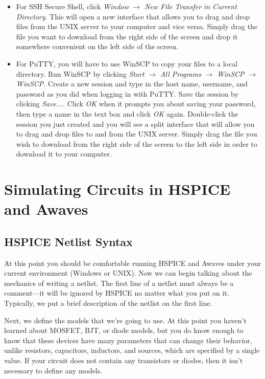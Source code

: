 \documentclass{article}
\begin{document}
\begin{enumerate}
    \begin{itemize}
      \item For SSH Secure Shell, click \textit{Window} $\rightarrow$ \textit{New File Transfer in Current Directory}. This will open a new interface that allows you to drag and drop files from the UNIX server to your computer and vice versa. Simply drag the file you want to download from the right side of the screen and drop it somewhere convenient on the left side of the screen.
      \item For PuTTY, you will have to use WinSCP to copy your files to a local directory. Run WinSCP by clicking \textit{Start} $\rightarrow$ \textit{All Programs} $\rightarrow$ \textit{WinSCP} $\rightarrow$ \textit{WinSCP}. Create a new session and type in the host name, username, and password as you did when logging in with PuTTY. Save the session by clicking \textit{Save...}. Click \textit{OK} when it prompts you about saving your password, then type a name in the text box and click \textit{OK} again. Double-click the session you just created and you will see a split interface that will allow you to drag and drop files to and from the UNIX server. Simply drag the file you wish to download from the right side of the screen to the left side in order to download it to your computer.
    \end{itemize}
\end{enumerate}

\section{Simulating Circuits in HSPICE and Awaves}

\subsection{HSPICE Netlist Syntax}

At this point you should be comfortable running HSPICE and Awaves under your current environment (Windows or UNIX). Now we can begin talking about the mechanics of writing a netlist. The first line of a netlist must always be a comment---it will be ignored by HSPICE no matter what you put on it. Typically, we put a brief description of the netlist on the first line.

Next, we define the models that we're going to use. At this point you haven't learned about MOSFET, BJT, or diode models, but you do know enough to know that these devices have many parameters that can change their behavior, unlike resistors, capacitors, inductors, and sources, which are specified by a single value. If your circuit does not contain any transistors or diodes, then it isn't necessary to define any models.
\end{document}

